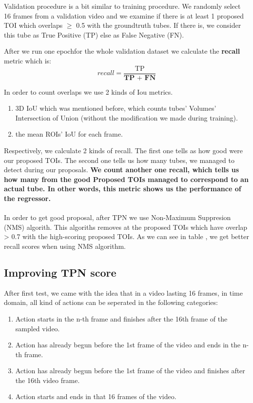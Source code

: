 \documentclass{report}
\begin{document}
Validation procedure is a bit similar to training procedure.
We randomly select 16 frames from a validation video and we examine if there is at least 1 proposed TOI
which overlaps $\ge$ 0.5 with the groundtruth tubes. If there is, we consider this tube as True Positive (TP) else as False Negative (FN).

After we run one epochfor the whole validation dataset we calculate the \textbf{recall} metric which is:
\[ recall = \frac{\text{TP}} {\textbf{TP + FN}} \]

In order to count overlaps we use 2 kinds of Iou metrics.
\begin{enumerate}
\item 3D IoU which was mentioned before, which counts tubes' Volumes' Intersection of Union (without the modification we made during training).
\item the mean ROIs'  IoU for each frame.
\end{enumerate}
Respectively, we calculate 2 kinds of recall. The first one tells as how good were our proposed TOIs. The second one tells us how many tubes,
we managed to detect during our proposals. \textbf{We count another one recall, which tells us how many from the good Proposed TOIs
   managed to correspond to an actual tube. In other words, this metric shows us the performance of the regressor.}

  
\paragraph{}
In order to get good proposal, after TPN we use Non-Maximum Suppresion (NMS) algorith. This algoriths removes at the proposed TOIs which have overlap > 0.7 with the
high-scoring proposed TOIs. As we can see in table {}, we get better recall scores when using NMS algorithm.

\subsection{Improving TPN score}
After first test, we came with the idea that in a video lasting 16 frames, in time domain, all kind of actions can be seperated in the following categories:
\begin{enumerate}
\item Action starts in the n-th  frame and finishes after the 16th frame of the sampled video.
\item Action has already begun before the 1st frame of the video and ends in the n-th frame.
\item Action has already begun before the 1st frame of the video and finishes after the 16th video frame.
\item Action starts and ends in that 16 frames of the video.
\end{enumerate}
\end{document}
